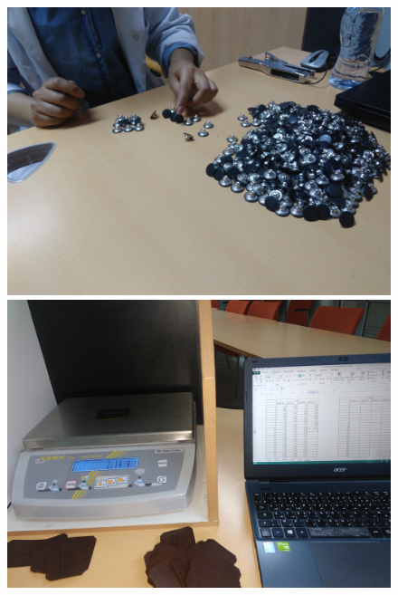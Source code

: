 \documentclass[12pt, a4paper]{thesis}
\begin{document}
\begin{figure}[!h]
\begin{center}
\includegraphics[scale=0.033]{a0.jpg}
\includegraphics[scale=0.033]{a1.jpg}\\

\end{center}
\end{figure}
\end{document}
